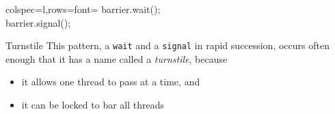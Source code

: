 \begin{frame}%
  \begin{center}
    \begin{tblr}{colspec={l},rows={font=\ttfamily}}
      {barrier.wait();\\barrier.signal();}
    \end{tblr}
  \end{center}
  \begin{block}{Turnstile}
    This pattern, a \texttt{wait} and a \texttt{signal} in rapid succession, occurs often
    enough that it has a name called a \emph{turnstile}, because
    \begin{itemize}
    \item it allows one thread to pass at a time, and
    \item it can be locked to bar all threads
    \end{itemize}
  \end{block}
\end{frame}


